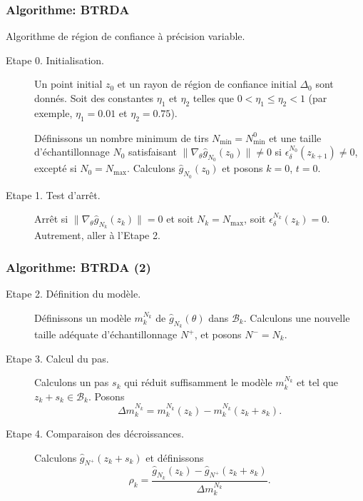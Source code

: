 \documentclass[french]{beamer}
\begin{document}
\begin{frame}
\frametitle{Algorithme: BTRDA}

Algorithme de région de confiance à précision variable.

\mbox{}

\begin{description}
\item[Etape 0. Initialisation.]
Un point initial $z_0$ et un rayon de région de confiance initial
$\Delta_0$ sont donnés.
Soit des constantes $\eta_1$ et $\eta_2$ telles que $0 < \eta_1 \leq
\eta_2 < 1$ (par exemple, $\eta_1 = 0.01$ et $\eta_2 = 0.75$).

Définissons un nombre minimum de tirs $N_{\min} = N^0_{\min}$ et une
taille d'échantillonnage $N_0$ satisfaisant $\| \nabla_{\theta}
\hat{g}_{N_0} (z_0) \| \ne 0$ si $\epsilon_{\delta}^{N_0}(z_{k+1}) \ne
0$, excepté si $N_0 = N_{\max}$.
Calculons $\hat{g}_{N_0}(z_0)$ et posons $k = 0$, $t = 0$.
\item[Etape 1. Test d'arrêt.]
Arrêt si $\| \nabla_{\theta} \hat{g}_{N_{k}}(z_{k})\| = 0$ et soit
$N_k = N_{\max}$, soit $\epsilon_{\delta}^{N_k}(z_k) = 0$.
Autrement, aller à l'Etape 2.
\end{description}

\end{frame}

\begin{frame}
\frametitle{Algorithme: BTRDA (2)}

\begin{description}
\item[Etape 2. Définition du modèle.]
Définissons un modèle $m_k^{N_k}$ de $\hat{g}_{N_k}(\theta)$ dans
$\mathcal{B}_k$.
Calculons une nouvelle taille adéquate d'échantillonnage $N^{+}$, et
posons $N^- = N_k$.
\item[Etape 3. Calcul du pas.]
Calculons un pas $s_k$ qui réduit suffisamment le modèle $m_k^{N_k}$
et tel que $z_k + s_k \in \mathcal{B}_k$.
Posons
\[ \Delta m_k^{N_k} = m_k^{N_k}(z_k) - m_k^{N_k}(z_k+s_k). \]
\item[Etape 4. Comparaison des décroissances.]
Calculons $\hat{g}_{N^+} (z_k + s_k)$ et définissons
\[
\rho_k = \frac{\hat{g}_{N_k}(z_k) - \hat{g}_{N^+}(z_k+s_k)}
{\Delta m_k^{N_k}}.
\]
\end{description}

\end{frame}
\end{document}

